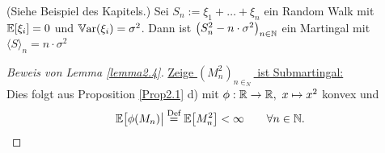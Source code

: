 \begin{beisp} %
	(Siehe Beispiel des Kapitels.) Sei $S_n:=\xi_1+\ldots+\xi_n$ ein Random Walk mit $\mathbb{E}[\xi_i]=0$ und $\mathbb{V}\text{ar}(\xi_i)=\sigma^2$.
	Dann ist
	$\big(S_n^2-n\cdot\sigma^2\big)_{n\in\mathbb{N}}$ ein Martingal mit $\langle S\rangle_n=n\cdot\sigma^2$
\end{beisp}

\begin{proof}[Beweis von Lemma \ref{lemma2.4}]\enter
	\underline{Zeige $(M_n^2)_{n\in_N}$ ist Submartingal:}\\
	Dies folgt aus Proposition \ref{Prop2.1} d) mit $\phi:\mathbb{R}\to\mathbb{R},~x\mapsto x^2$ konvex und 
	\begin{align*}
		\mathbb{E}\big[\phi(M_n)\big|\overset{\text{Def}}{=}\mathbb{E}\big[M_n^2\big]<\infty\qquad\forall n\in\mathbb{N}.
	\end{align*}
	

\end{proof}
